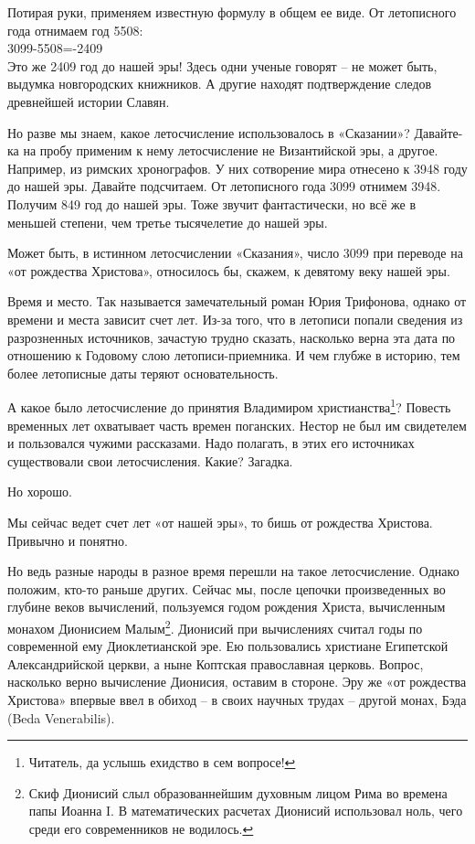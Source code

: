 Потирая руки, применяем известную формулу в общем ее виде. От летописного года отнимаем год 5508:\\

3099-5508=-2409\\

Это же 2409 год до нашей эры! Здесь одни ученые говорят – не может быть, выдумка новгородских книжников. А другие находят подтверждение следов древнейшей истории Славян.

Но разве мы знаем, какое летосчисление использовалось в «Сказании»? Давайте-ка на пробу применим к нему летосчисление не Византийской эры, а другое. Например, из римских хронографов. У них сотворение мира отнесено к 3948 году до нашей эры. Давайте подсчитаем. От летописного года 3099 отнимем 3948. Получим 849 год до нашей эры. Тоже звучит фантастически, но всё же в меньшей степени, чем третье тысячелетие до нашей эры.

Может быть, в истинном летосчислении «Сказания», число 3099 при переводе на «от рождества Христова», относилось бы, скажем, к девятому веку нашей эры.

Время и место. Так называется замечательный роман Юрия Трифонова, однако от времени и места зависит счет лет. Из-за того, что в летописи попали сведения из разрозненных источников, зачастую трудно сказать, насколько верна эта дата по отношению к Годовому слою летописи-приемника. И чем глубже в историю, тем более летописные даты теряют основательность.

А какое было летосчисление до принятия Владимиром христианства\footnote{Читатель, да услышь ехидство в сем вопросе!}? Повесть временных лет охватывает часть времен поганских. Нестор не был им свидетелем и пользовался чужими рассказами. Надо полагать, в этих его источниках существовали свои летосчисления. Какие? Загадка.

Но хорошо.

Мы сейчас ведет счет лет «от нашей эры», то бишь от рождества Христова. Привычно и понятно.

Но ведь разные народы в разное время перешли на такое летосчисление. Однако положим, кто-то раньше других. Сейчас мы, после цепочки произведенных во глубине веков вычислений, пользуемся годом рождения Христа, вычисленным монахом Дионисием Малым\footnote{Скиф Дионисий слыл образованнейшим духовным лицом Рима во времена папы Иоанна I. В математических расчетах Дионисий использовал ноль, чего среди его современников не водилось.}. Дионисий при вычислениях считал годы по современной ему Диоклетианской эре. Ею пользовались христиане Египетской Александрийской церкви, а ныне Коптская православная церковь. Вопрос, насколько верно вычисление Дионисия, оставим в стороне. Эру же «от рождества Христова» впервые ввел в обиход – в своих научных трудах – другой монах, Бэда (Beda Venerabilis).


